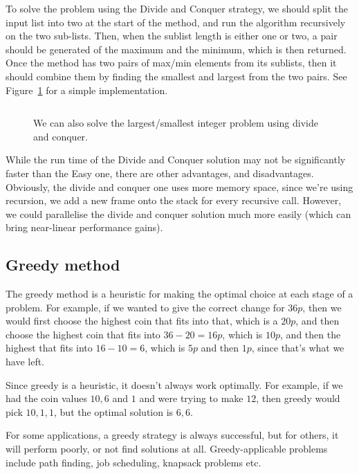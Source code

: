 To solve the problem using the Divide and Conquer strategy, we should split the
input list into two at the start of the method, and run the algorithm
recursively on the two sub-lists. Then, when the sublist length is either one or
two, a pair should be generated of the maximum and the minimum, which is then
returned. Once the method has two pairs of max/min elements from its sublists,
then it should combine them by finding the smallest and largest from the two
pairs. See Figure~\ref{d-and-c-soln} for a simple implementation.

\begin{figure}[H]
  \label{d-and-c-soln}
  \inputminted{java}{code/MinMax/DivideAndConquer.java}
  \caption{We can also solve the largest/smallest integer problem using divide
  and conquer.}
\end{figure}

While the run time of the Divide and Conquer solution may not be significantly
faster than the Easy one, there are other advantages, and disadvantages.
Obviously, the divide and conquer one uses more memory space, since we're using
recursion, we add a new frame onto the stack for every recursive call. However,
we could parallelise the divide and conquer solution much more easily (which can
bring near-linear performance gains).

\subsection{Greedy method}

The greedy method is a heuristic for making the optimal choice at each stage of
a problem. For example, if we wanted to give the correct change for $36p$, then
we would first choose the highest coin that fits into that, which is a $20p$,
and then choose the highest coin that fits into $36-20=16p$, which is $10p$, and
then the highest that fits into $16 - 10 = 6$, which is $5p$ and then $1p$,
since that's what we have left.

Since greedy is a heuristic, it doesn't always work optimally. For example, if
we had the coin values $10, 6$ and $1$ and were trying to make $12$, then greedy
would pick $10,1,1$, but the optimal solution is $6,6$.


For some applications, a greedy strategy is always successful, but for others,
it will perform poorly, or not find solutions at all. Greedy-applicable problems
include path finding, job scheduling, knapsack problems etc.

